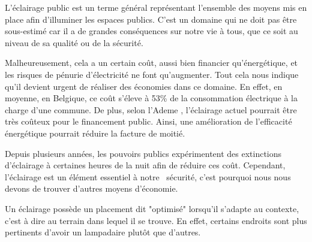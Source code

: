  
 
L'\'eclairage public est un terme g\'en\'eral repr\'esentant l'ensemble des moyens mis en place afin d'illuminer les espaces publics. C'est un domaine qui ne doit pas \^etre sous-estim\'e car il a de grandes cons\'equences sur notre vie \`a tous, que ce soit au niveau de sa qualit\'e ou de la s\'ecurit\'e. \cite{projwebsite}

 
 

Malheureusement, cela a un certain co\^ut, aussi bien financier qu'\'energ\'etique, et  les risques de p\'enurie d'\'electricit\'e ne font qu'augmenter. Tout cela nous indique qu'il devient urgent de r\'ealiser des \'economies dans ce domaine. En effet, en moyenne, en Belgique, ce co\^ut  s'\'eleve \`a 53\% de la consommation \'electrique \`a la charge d'une commune. De plus, selon l'Ademe \cite{ademe}, l'\'eclairage actuel pourrait \^etre tr\`es co\^uteux pour le financement public. Ainsi, une am\'elioration de l'efficacit\'e \'energ\'etique pourrait r\'eduire la facture de moiti\'e.




Depuis plusieurs ann\'ees, les pouvoirs publics exp\'erimentent des extinctions d'\'eclairage \`a certaines heures de la nuit afin de r\'eduire ces co\^ut. Cependant, l'\'eclairage est un \'el\'ement essentiel \`a notre \ s\'ecurit\'e, c'est pourquoi nous nous devons de trouver d'autres moyens d'\'economie.




Un \'eclairage poss\`ede un placement dit "optimis\'e" lorsqu'il s'adapte au contexte, c'est à dire au terrain dans lequel il se trouve. En effet, certains endroits sont plus pertinents d'avoir un lampadaire plutôt que d'autres.